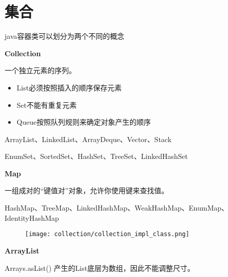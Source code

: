 \chapter{集合}
\label{chap:collection}

java容器类可以划分为两个不同的概念

\textbf{Collection} 

一个独立元素的序列。

\begin{itemize}
    \item   List必须按照插入的顺序保存元素
    \item   Set不能有重复元素
    \item   Queue按照队列规则来确定对象产生的顺序
\end{itemize}

ArrayList、LinkedList、ArrayDeque、Vector、Stack

EnumSet、SortedSet、HashSet、TreeSet、LinkedHashSet


\textbf{Map}

一组成对的“键值对”对象，允许你使用键来查找值。

HashMap、TreeMap、LinkedHashMap、WeakHashMap、EnumMap、IdentityHashMap

\begin{figure}[H]
    \centering
    \texttt{[image: collection/collection\_impl\_class.png]}
\end{figure}


\textbf{ArrayList}






Arrays.asList() 产生的List底层为数组，因此不能调整尺寸。







